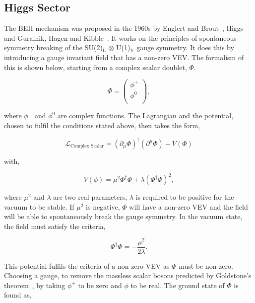 \subsection{Higgs Sector}

The \ac{BEH} mechanism was proposed in the 1960s by Englert and Brout~\cite{Englert:1964et}, Higgs~\cite{Higgs:1964ia,Higgs:1964pj,Higgs:1966ev} and Guralnik, Hagen and Kibble~\cite{Guralnik:1964eu,Kibble:1967sv}.
It works on the principles of spontaneous symmetry breaking of the SU(2)$_{\text{L}}$ $\otimes$ U(1)$_{\text{Y}}$ gauge symmetry.
It does this by introducing a gauge invariant field that has a non-zero \ac{VEV}.
The formalism of this is shown below, starting from a complex scalar doublet, $\Phi$. 

\begin{equation}
	\Phi = 
	\begin{pmatrix} 
		\phi^{+} \\
		\phi^{0} \\
	\end{pmatrix},
\end{equation}

where $\phi^{+}$ and $\phi^{0}$ are complex functions.
The Lagrangian and the potential, chosen to fulfil the conditions stated above, then takes the form,

\begin{equation}
	\mathcal{L}_{\text{Complex Scalar}} = (\partial_{\mu}\Phi)^{\dagger} (\partial^{\mu}\Phi) - V(\Phi)
\end{equation}

with,

\begin{equation}
V(\phi) = \mu^2 \Phi^{\dagger} \Phi + \lambda (\Phi^{\dagger} \Phi)^2,
\end{equation}

where $\mu^2$ and $\lambda$ are two real parameters, $\lambda$ is required to be positive for the vacuum to be stable.
If $\mu^2$ is negative, $\Phi$ will have a non-zero \ac{VEV} and the field will be able to spontaneously break the gauge symmetry.
In the vacuum state, the field must satisfy the criteria,

\begin{equation}
\Phi^{\dagger} \Phi = -\frac{\mu^2}{2\lambda}.
\end{equation}

This potential fulfils the criteria of a non-zero \ac{VEV} as $\Phi$ must be non-zero. 
Choosing a gauge, to remove the massless scalar bosons predicted by Goldstone's theorem~\cite{Goldstone:1961eq}, by taking $\phi^+$ to be zero and $\phi$ to be real.
The ground state of $\Phi$ is found as,

